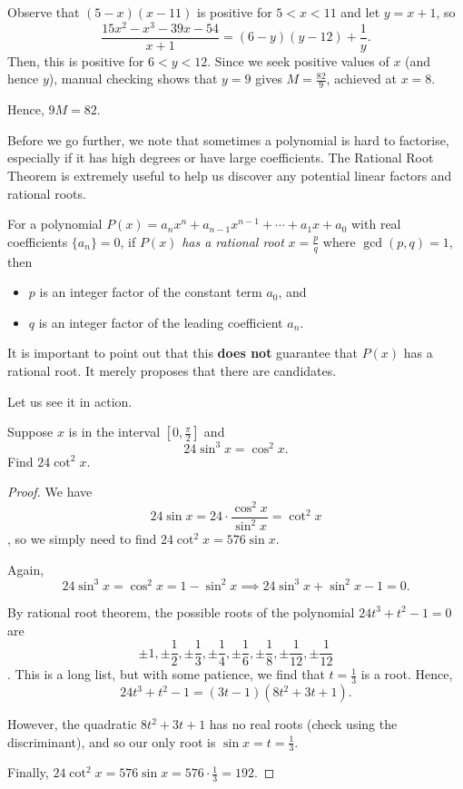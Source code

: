 \documentclass[../jarvis.tex]{subfiles}
\begin{document}
Observe that $(5-x)(x-11)$ is positive for $5<x<11$ and let $y=x+1$, so 
    $$\frac{15x^2-x^3-39x-54}{x+1}=(6-y)(y-12)+\frac{1}{y}.$$
Then, this is positive for $6<y<12$. Since we seek positive values of $x$ (and hence $y$), manual checking shows that $y=9$ gives $M=\frac{82}{9}$, achieved at $x=8$.

Hence, $9M=\boxed{82}$.

Before we go further, we note that sometimes a polynomial is  hard to factorise, especially if it has high degrees or have large coefficients. The Rational Root Theorem is extremely useful to help us discover any potential linear factors and rational roots.
\begin{proposition}
For a polynomial $P(x)=a_nx^n+a_{n-1}x^{n-1}+\cdots+a_1x+a_0$ with real coefficients $\{a_n\}=0$, if $P(x)$ \textit{has a rational root} $x=\frac{p}{q}$ where $\gcd(p,q)=1$, then
\begin{itemize}
    \item $p$ is an integer factor of the constant term $a_0$, and
    \item $q$ is an integer factor of the leading coefficient $a_n$.
\end{itemize}
\end{proposition}
It is important to point out that this \textbf{does not} guarantee that $P(x)$ has a rational root. It merely proposes that there are candidates.

Let us see it in action.
\begin{example}[2011 AIME I/9]
    Suppose $x$ is in the interval $[0,\frac{\pi}{2}]$ and $$24\sin^3{x}=\cos^2{x}.$$
    Find $24\cot^2{x}$.
\end{example}
\begin{proof}
    We have $$24\sin{x}=24\cdot\frac{\cos^2{x}}{\sin^2{x}}=\cot^2{x}$$, so we simply need to find $24\cot^2{x}=576\sin{x}$.

    Again, $$24\sin^3{x}=\cos^2{x}=1-\sin^2{x} \implies 24\sin^3{x}+\sin^2{x}-1=0.$$

    By rational root theorem, the possible roots of the polynomial $24t^3+t^2-1=0$ are $$\pm 1,\pm \frac{1}{2},\pm \frac{1}{3},\pm \frac{1}{4},\pm \frac{1}{6},\pm \frac{1}{8},\pm \frac{1}{12},\pm \frac{1}{12}$$. This is a long list, but with some patience, we find that $t=\frac{1}{3}$ is a root. Hence, $$24t^3+t^2-1=(3t-1)(8t^2+3t+1).$$

    However, the quadratic $8t^2+3t+1$ has no real roots (check using the discriminant), and so our only root is $\sin{x}=t=\frac{1}{3}$. 

    Finally, $24\cot^2{x}=576\sin{x}=576\cdot\frac{1}{3}=\boxed{192}.$
\end{proof}
\end{document}
